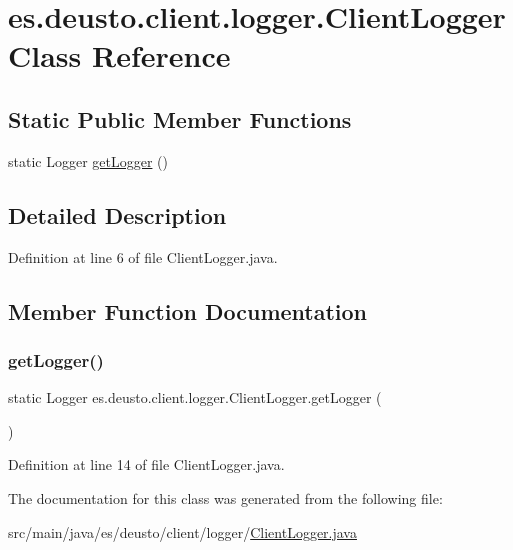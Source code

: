 \hypertarget{classes_1_1deusto_1_1client_1_1logger_1_1_client_logger}{}\section{es.\+deusto.\+client.\+logger.\+Client\+Logger Class Reference}
\label{classes_1_1deusto_1_1client_1_1logger_1_1_client_logger}
\subsection*{Static Public Member Functions}
\begin{DoxyCompactItemize}
\item 
static Logger \mbox{\hyperlink{classes_1_1deusto_1_1client_1_1logger_1_1_client_logger_a35927573d2e2138960e27bbd4009d4e5}{get\+Logger}} ()
\end{DoxyCompactItemize}


\subsection{Detailed Description}


Definition at line 6 of file Client\+Logger.\+java.



\subsection{Member Function Documentation}
\mbox{\label{classes_1_1deusto_1_1client_1_1logger_1_1_client_logger_a35927573d2e2138960e27bbd4009d4e5}} 
\subsubsection{\texorpdfstring{getLogger()}{getLogger()}}
{\footnotesize\ttfamily static Logger es.\+deusto.\+client.\+logger.\+Client\+Logger.\+get\+Logger (\begin{DoxyParamCaption}{ }\end{DoxyParamCaption})\hspace{0.3cm}{\ttfamily [static]}}



Definition at line 14 of file Client\+Logger.\+java.



The documentation for this class was generated from the following file\+:\begin{DoxyCompactItemize}
\item 
src/main/java/es/deusto/client/logger/\mbox{\hyperlink{_client_logger_8java}{Client\+Logger.\+java}}\end{DoxyCompactItemize}
